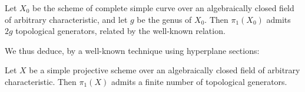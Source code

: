 \begin{corollary}\label{fga2-theorem-12-corollary-3}
    Let $X_0$ be the scheme of complete simple curve over an algebraically closed field of arbitrary characteristic, and let $g$ be the genus of $X_0$.
    Then $\pi_1(X_0)$ admits $2g$ topological generators, related by the well-known relation.
\end{corollary}


We thus deduce, by a well-known technique using hyperplane sections:

\begin{corollary}\label{fga2-theorem-12-corollary-4}
    Let $X$ be a simple projective scheme over an algebraically closed field of arbitrary characteristic.
    Then $\pi_1(X)$ admits a finite number of topological generators.
\end{corollary}


